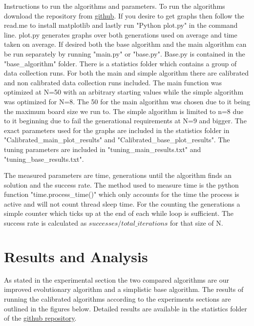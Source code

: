\documentclass{scrartcl}
\begin{document}
Instructions to run the algorithms and parameters. To run the algorithms download the repository from \href{https://github.com/Sneakycloud/N-queens\_problem\_Evolutionary\_Alg/tree/main}{github}. If you desire to get graphs then follow the read.me to install matplotlib and lastly run "Python plot.py" in the command line. plot.py generates graphs over both generations used on average and time taken on average. If desired both the base algorithm and the main algorithm can be run separately by running "main.py" or "base.py". Base.py is contained in the "base\_algorithm" folder. There is a statistics folder which contains a group of data collection runs. For both the main and simple algorithm there are calibrated and non calibrated data collection runs included. The main function was optimized at N=50 with an arbitrary starting values while the simple algorithm was optimized for N=8. The 50 for the main algorithm was chosen due to it being the maximum board size we run to. The simple algorithm is limited to n=8 due to it beginning due to fail the generational requirements at N=9 and bigger.  The exact parameters used for the graphs are included in the statistics folder in "Calibrated\_main\_plot\_results" and "Calibrated\_base\_plot\_results". The tuning parameters are included in "tuning\_main\_results.txt" and "tuning\_base\_results.txt".

The measured parameters are time, generations until the algorithm finds an solution and the success rate. The method used to measure time is the python function "time.process\_time()" which only accounts for the time the process is active and will not count thread sleep time. For the counting the generations a simple counter which ticks up at the end of each while loop is sufficient. The success rate is calculated as \(successes / total\_iterations\) for that size of N.

\section{Results and Analysis}
\label{sec:results-analysis}
As stated in the experimental section the two compared algorithms are our improved evolutionary algorithm and a simplistic base algorithm.  The results of running the calibrated algorithms according to the experiments sections are outlined in the figures below. Detailed results are available in the statistics folder of the  \href{https://github.com/Sneakycloud/N-queens\_problem\_Evolutionary\_Alg/tree/main}{github repository}.
\end{document}
